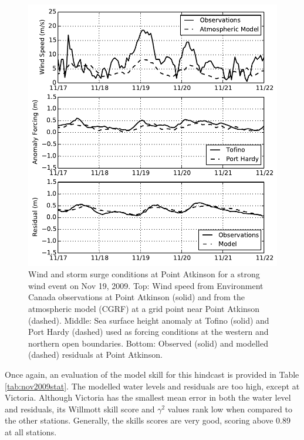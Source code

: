 \documentclass[pdftex,10pt]{article}
\begin{document}
\begin{figure}
\centering
\includegraphics[scale=0.6]{Figures/nov2009.pdf}
\caption{Wind and storm surge conditions at Point Atkinson for a strong wind event on Nov 19, 2009. Top: Wind speed from Environment Canada observations at Point Atkinson (solid) and from the atmospheric model (CGRF) at a grid point near Point Atkinson (dashed). Middle: Sea surface height anomaly at Tofino (solid) and Port Hardy (dashed) used as forcing conditions at the western and northern open boundaries. Bottom: Observed (solid) and modelled (dashed) residuals at Point Atkinson.  }
\label{fig:nov2009}
\end{figure}

Once again, an evaluation of the model skill for this hindcast is provided in Table \ref{tab:nov2009stat}. The modelled water levels and residuals are too high, except at Victoria. Although Victoria has the smallest mean error in both the water level and residuals, its Willmott skill score and $\gamma^2$ values rank low when compared to the other stations. Generally, the skills scores are very good, scoring above 0.89 at all stations. 
\end{document}
